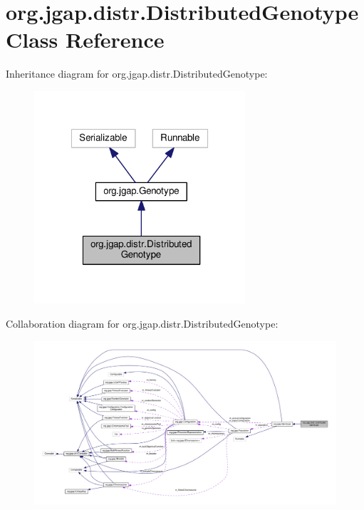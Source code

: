 \hypertarget{classorg_1_1jgap_1_1distr_1_1_distributed_genotype}{\section{org.\-jgap.\-distr.\-Distributed\-Genotype Class Reference}
\label{classorg_1_1jgap_1_1distr_1_1_distributed_genotype}
}


Inheritance diagram for org.\-jgap.\-distr.\-Distributed\-Genotype\-:
\nopagebreak
\begin{figure}[H]
\begin{center}
\leavevmode
\includegraphics[width=222pt]{classorg_1_1jgap_1_1distr_1_1_distributed_genotype__inherit__graph}
\end{center}
\end{figure}


Collaboration diagram for org.\-jgap.\-distr.\-Distributed\-Genotype\-:
\nopagebreak
\begin{figure}[H]
\begin{center}
\leavevmode
\includegraphics[width=350pt]{classorg_1_1jgap_1_1distr_1_1_distributed_genotype__coll__graph}
\end{center}
\end{figure}
